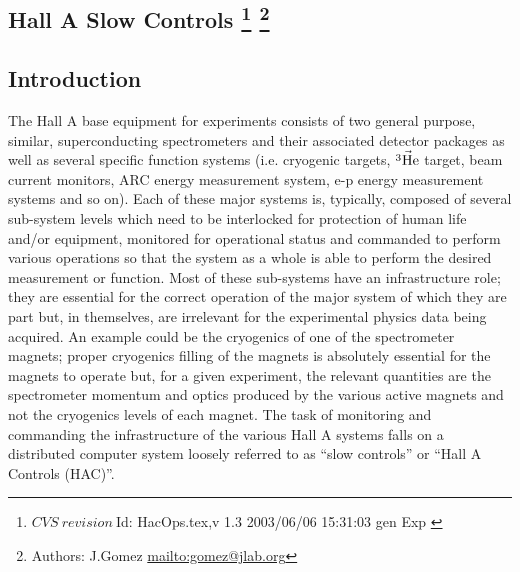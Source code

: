 \subsection[Hall A Slow Controls]{Hall A Slow Controls
\footnote{
  $CVS~revision~ $Id: HacOps.tex,v 1.3 2003/06/06 15:31:03 gen Exp $ $
}
\footnote{Authors: J.Gomez \url{mailto:gomez@jlab.org}}
}

\subsection{Introduction}
The Hall A base equipment for experiments consists of two general purpose, 
similar, superconducting spectrometers and their associated detector packages as well as
several specific function systems (i.e. cryogenic targets, $\vec{\rm ^3He}$ target, beam current monitors,
ARC energy measurement system, e-p energy measurement systems and so on).
Each of these major systems is, typically, composed of several sub-system levels which need
to be interlocked for protection of human life and/or equipment, monitored for operational status and
commanded to perform various operations so that the system as a whole is able to perform the desired measurement
or function.
Most of these sub-systems have an infrastructure role; they are essential for the correct operation
of the major system of which they are part but, in themselves, are irrelevant for the experimental
physics data being acquired.
An example could be the cryogenics of one of the spectrometer magnets; proper cryogenics filling of the magnets
is absolutely essential for the magnets to operate but, for a given experiment, the relevant quantities are 
the spectrometer momentum and optics produced by the various active magnets and not the cryogenics
levels of each magnet.
The task of monitoring and commanding the infrastructure of the various Hall A systems
falls on a distributed computer system loosely referred to as ``slow controls'' or
``Hall A Controls (HAC)''. 

